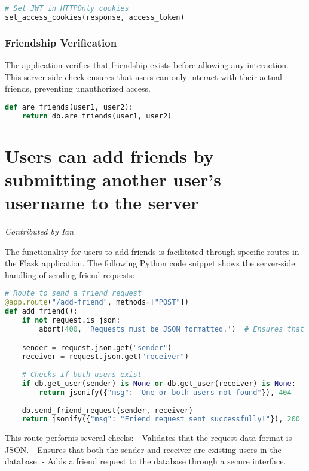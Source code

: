 \documentclass{article}
\begin{document}
\begin{lstlisting}[language=Python, caption={JWT Session Management}]
# Set JWT in HTTPOnly cookies
set_access_cookies(response, access_token)
\end{lstlisting}

\subsubsection{Friendship Verification}
The application verifies that friendship exists before allowing any interaction. This server-side check ensures that users can only interact with their actual friends, preventing unauthorized access.

\begin{lstlisting}[language=Python, caption={Friendship Verification}]
def are_friends(user1, user2):
    return db.are_friends(user1, user2)
\end{lstlisting}

\section{Users can add friends by submitting another user's username to the server}
\textit{Contributed by Ian}

The functionality for users to add friends is facilitated through specific routes in the Flask application. The following Python code snippet shows the server-side handling of sending friend requests:

\begin{lstlisting}[language=Python, caption={Handling Friend Requests}]
# Route to send a friend request
@app.route("/add-friend", methods=["POST"])
def add_friend():
    if not request.is_json:
        abort(400, 'Requests must be JSON formatted.')  # Ensures that the request is in JSON format

    sender = request.json.get("sender")
    receiver = request.json.get("receiver")
    
    # Checks if both users exist
    if db.get_user(sender) is None or db.get_user(receiver) is None:
        return jsonify({"msg": "One or both users not found"}), 404
    
    db.send_friend_request(sender, receiver)
    return jsonify({"msg": "Friend request sent successfully!"}), 200
\end{lstlisting}

This route performs several checks:
- Validates that the request data format is JSON.
- Ensures that both the sender and receiver are existing users in the database.
- Adds a friend request to the database through a secure interface.
\end{document}
